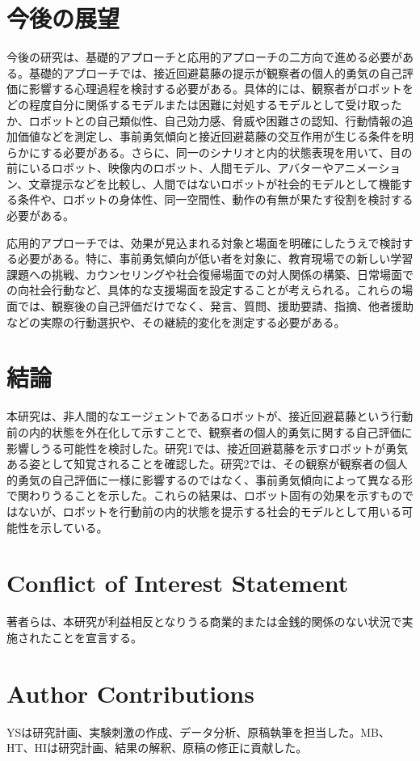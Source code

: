 \documentclass[utf8]{FrontiersinHarvard}
\begin{document}
\section{今後の展望}

今後の研究は、基礎的アプローチと応用的アプローチの二方向で進める必要がある。基礎的アプローチでは、接近回避葛藤の提示が観察者の個人的勇気の自己評価に影響する心理過程を検討する必要がある。具体的には、観察者がロボットをどの程度自分に関係するモデルまたは困難に対処するモデルとして受け取ったか、ロボットとの自己類似性、自己効力感、脅威や困難さの認知、行動情報の追加価値などを測定し、事前勇気傾向と接近回避葛藤の交互作用が生じる条件を明らかにする必要がある。さらに、同一のシナリオと内的状態表現を用いて、目の前にいるロボット、映像内のロボット、人間モデル、アバターやアニメーション、文章提示などを比較し、人間ではないロボットが社会的モデルとして機能する条件や、ロボットの身体性、同一空間性、動作の有無が果たす役割を検討する必要がある。

応用的アプローチでは、効果が見込まれる対象と場面を明確にしたうえで検討する必要がある。特に、事前勇気傾向が低い者を対象に、教育現場での新しい学習課題への挑戦、カウンセリングや社会復帰場面での対人関係の構築、日常場面での向社会行動など、具体的な支援場面を設定することが考えられる。これらの場面では、観察後の自己評価だけでなく、発言、質問、援助要請、指摘、他者援助などの実際の行動選択や、その継続的変化を測定する必要がある。


\section{結論}

本研究は、非人間的なエージェントであるロボットが、接近回避葛藤という行動前の内的状態を外在化して示すことで、観察者の個人的勇気に関する自己評価に影響しうる可能性を検討した。研究1では、接近回避葛藤を示すロボットが勇気ある姿として知覚されることを確認した。研究2では、その観察が観察者の個人的勇気の自己評価に一様に影響するのではなく、事前勇気傾向によって異なる形で関わりうることを示した。これらの結果は、ロボット固有の効果を示すものではないが、ロボットを行動前の内的状態を提示する社会的モデルとして用いる可能性を示している。


\section*{Conflict of Interest Statement}
著者らは、本研究が利益相反となりうる商業的または金銭的関係のない状況で実施されたことを宣言する。

\section*{Author Contributions}
YSは研究計画、実験刺激の作成、データ分析、原稿執筆を担当した。MB、HT、HIは研究計画、結果の解釈、原稿の修正に貢献した。
\end{document}
